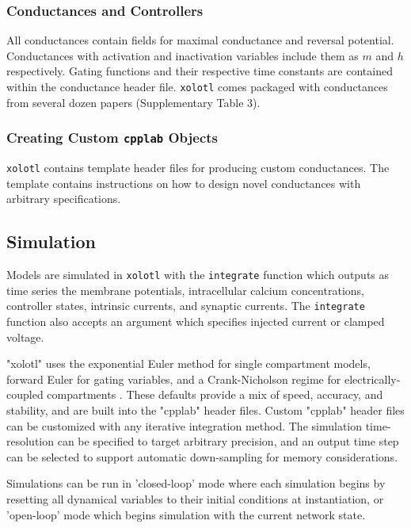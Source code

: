 \documentclass{frontiersSCNS} %
\begin{document}
\subsubsection{Conductances and Controllers}

All conductances contain fields for maximal conductance and reversal potential. Conductances with activation and inactivation variables include them as $m$ and $h$ respectively. Gating functions and their respective time constants are contained within the conductance header file. \texttt{xolotl} comes packaged with conductances from several dozen papers (Supplementary Table 3).

\subsubsection{Creating Custom \texttt{cpplab} Objects}

\texttt{xolotl} contains template header files for producing custom conductances. The template contains instructions on how to design novel conductances with arbitrary specifications.

\subsection{Simulation}

Models are simulated in \texttt{xolotl} with the \texttt{integrate} function which outputs as time series the membrane potentials, intracellular calcium concentrations, controller states, intrinsic currents, and synaptic currents. The \texttt{integrate} function also accepts an argument which specifies injected current or clamped voltage. 

"xolotl" uses the exponential Euler method for single compartment models, forward Euler for gating variables, and a Crank-Nicholson regime for electrically-coupled compartments \autocite{ohErrorAnalysisSpecialized2006, dayanTheoreticalNeuroscience2001, butcherNumericalDifferentialEquation2016}. These defaults provide a mix of speed, accuracy, and stability, and are built into the "cpplab" header files. Custom "cpplab" header files can be customized with any iterative integration method. The simulation time-resolution can be specified to target arbitrary precision, and an output time step can be selected to support automatic down-sampling for memory considerations.

Simulations can be run in 'closed-loop' mode where each simulation begins by resetting all dynamical variables to their initial conditions at instantiation, or 'open-loop' mode which begins simulation with the current network state.
\end{document}
